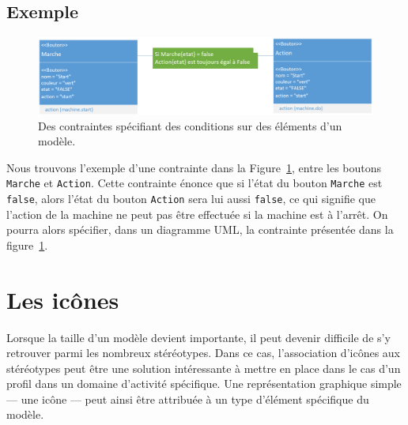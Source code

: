 \subsection*{Exemple}
%
\begin{figure}[H]
    \begin{center}
    \includegraphics[width=\linewidth]{10_img/chap4/constraint.PNG}
    \caption{Des contraintes sp\'ecifiant des conditions sur des \'el\'ements d'un modèle.}
    \label{fig.uml_con}
    \end{center}
\end{figure}


Nous trouvons l'exemple d'une contrainte dans la Figure~\ref{fig.uml_con}, entre les boutons \texttt{Marche} et \texttt{Action}.
Cette contrainte énonce que si l'état du bouton \texttt{Marche} est \texttt{false}, alors l'état du bouton \texttt{Action} sera lui aussi \texttt{false},
ce qui signifie que l'action de la machine ne peut pas être effectuée si la machine est à l'arrêt.
On pourra alors sp\'ecifier, dans un diagramme UML, la contrainte présent\'ee dans la figure~\ref{fig.uml_con}.


\section{Les ic\^ones}
Lorsque la taille d'un modèle devient importante, il peut devenir difficile de s'y retrouver parmi les nombreux st\'er\'eotypes.
Dans ce cas, l'association d'ic\^ones aux st\'er\'eotypes peut être une solution int\'eressante à mettre en place dans le cas d'un profil dans un domaine d'activité spécifique.
Une représentation graphique simple --- une ic\^one --- peut ainsi être attribuée à un type d'élément spécifique du modèle.

